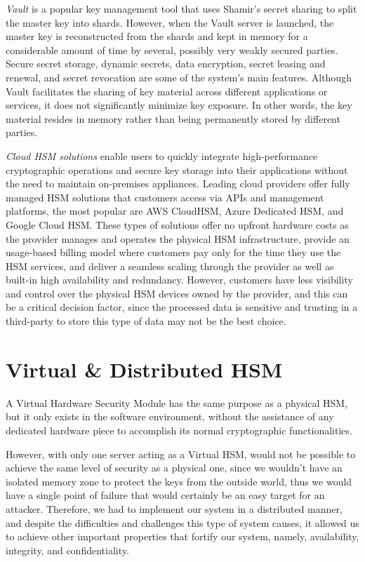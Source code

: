 \documentclass[runningheads]{llncs}
\begin{document}
\textit{Vault} \cite{vault} is a popular key management tool that uses Shamir's secret sharing to split the master key into shards. However, when the Vault server is launched, the master key is reconstructed from the shards and kept in memory for a considerable amount of time by several, possibly very weakly secured parties. Secure secret storage, dynamic secrets, data encryption, secret leasing and renewal, and secret revocation are some of the system's main features. Although Vault facilitates the sharing of key material across different applications or services, it does not significantly minimize key exposure. In other words, the key material resides in memory rather than being permanently stored by different parties.

\textit{Cloud HSM solutions} \cite{physicalvscloudhsm} enable users to quickly integrate high-performance cryptographic operations and secure key storage into their applications without the need to maintain on-premises appliances. Leading cloud providers offer fully managed HSM solutions that customers access via APIs and management platforms, the most popular are AWS CloudHSM, Azure Dedicated HSM, and Google Cloud HSM. These types of solutions offer no upfront hardware costs as the provider manages and operates the physical HSM infrastructure, provide an usage-based billing model where customers pay only for the time they use the HSM services, and deliver a seamless scaling through the provider as well as built-in high availability and redundancy. However, customers have less visibility and control over the physical HSM devices owned by the provider, and this can be a critical decision factor, since the processed data is sensitive and trusting in a third-party to store this type of data may not be the best choice.  

\section{Virtual \& Distributed HSM} \label{sec:distvirtualhsm}

A Virtual Hardware Security Module has the same purpose as a physical HSM, but it only exists in the software environment, without the assistance of any dedicated hardware piece to accomplish its normal cryptographic functionalities. 

However, with only one server acting as a Virtual HSM, would not be possible to achieve the same level of security as a physical one, since we wouldn't have an isolated memory zone to protect the keys from the outside world, thus we would have a single point of failure that would certainly be an easy target for an attacker. Therefore, we had to implement our system in a distributed manner, and despite the difficulties and challenges this type of system causes, it allowed us to achieve other important properties that fortify our system, namely, availability, integrity, and confidentiality.   
\end{document}
